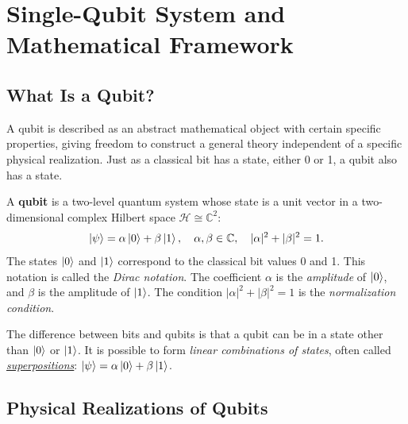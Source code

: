 \documentclass[10pt,a4paper]{article}
\begin{document}
\section{Single-Qubit System and Mathematical Framework}

\subsection{What Is a Qubit?}

A qubit is described as an abstract mathematical object with certain specific properties, giving freedom to construct a general theory independent of a specific physical realization. Just as a classical bit has a state, either 0 or 1, a qubit also has a state.

\begin{tcolorbox}[defstyle, title={Definition: Qubit}]
A \textbf{qubit} is a two-level quantum system whose state is a unit vector in a two-dimensional complex Hilbert space $\mathcal{H}\cong\mathbb{C}^2$:
\[
\ket{\psi} = \alpha\ket{0} + \beta\ket{1}, \quad \alpha,\beta\in\mathbb{C}, \quad |\alpha|^2 + |\beta|^2 = 1.
\]
The states $\ket{0}$ and $\ket{1}$ correspond to the classical bit values 0 and 1. This notation is called the \emph{Dirac notation}. The coefficient $\alpha$ is the \emph{amplitude} of $\ket{0}$, and $\beta$ is the amplitude of $\ket{1}$. The condition $|\alpha|^2+|\beta|^2=1$ is the \emph{normalization condition}.
\end{tcolorbox}

The difference between bits and qubits is that a qubit can be in a state other than $\ket{0}$ or $\ket{1}$. It is possible to form \emph{linear combinations of states}, often called \uline{\emph{superpositions}}: $\ket{\psi}=\alpha\ket{0}+\beta\ket{1}$.

\subsection{Physical Realizations of Qubits}
\end{document}
